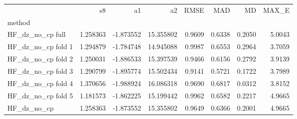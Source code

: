 \begin{tabular}{lrrrrrrr}
 & s8 & a1 & a2 & RMSE & MAD & MD & MAX_E \\
method &  &  &  &  &  &  &  \\
HF_dz_no_cp full & 1.258363 & -1.873552 & 15.355802 & 0.9609 & 0.6338 & 0.2050 & 5.0043 \\
HF_dz_no_cp fold 1 & 1.294879 & -1.784748 & 14.945088 & 0.9987 & 0.6553 & 0.2964 & 3.7059 \\
HF_dz_no_cp fold 2 & 1.250031 & -1.886533 & 15.397539 & 0.9466 & 0.6156 & 0.2792 & 3.9139 \\
HF_dz_no_cp fold 3 & 1.290799 & -1.895774 & 15.502434 & 0.9141 & 0.5721 & 0.1722 & 3.7989 \\
HF_dz_no_cp fold 4 & 1.370656 & -1.988924 & 16.086318 & 0.9690 & 0.6817 & 0.0312 & 3.8152 \\
HF_dz_no_cp fold 5 & 1.181573 & -1.862225 & 15.199442 & 0.9962 & 0.6582 & 0.2217 & 4.9665 \\
HF_dz_no_cp & 1.258363 & -1.873552 & 15.355802 & 0.9649 & 0.6366 & 0.2001 & 4.9665 \\
\end{tabular}
